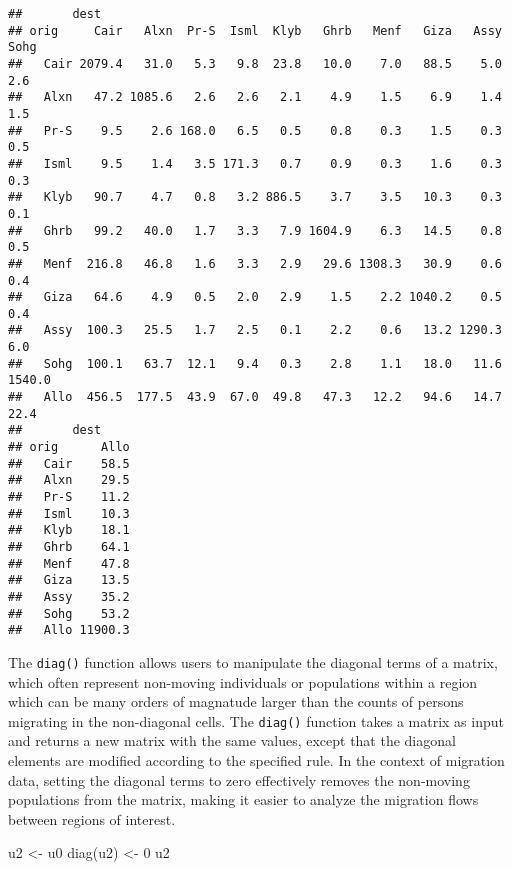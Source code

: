 \documentclass[
]{book}
\newenvironment{Shaded}{\begin{snugshade}}{\end{snugshade}}
\newcommand{\DecValTok}[1]{\textcolor[rgb]{0.00,0.00,0.81}{#1}}
\newcommand{\FunctionTok}[1]{\textcolor[rgb]{0.00,0.00,0.00}{#1}}
\newcommand{\NormalTok}[1]{#1}
\newcommand{\OtherTok}[1]{\textcolor[rgb]{0.56,0.35,0.01}{#1}}
\begin{document}
\begin{verbatim}
##       dest
## orig     Cair   Alxn  Pr-S  Isml  Klyb   Ghrb   Menf   Giza   Assy   Sohg
##   Cair 2079.4   31.0   5.3   9.8  23.8   10.0    7.0   88.5    5.0    2.6
##   Alxn   47.2 1085.6   2.6   2.6   2.1    4.9    1.5    6.9    1.4    1.5
##   Pr-S    9.5    2.6 168.0   6.5   0.5    0.8    0.3    1.5    0.3    0.5
##   Isml    9.5    1.4   3.5 171.3   0.7    0.9    0.3    1.6    0.3    0.3
##   Klyb   90.7    4.7   0.8   3.2 886.5    3.7    3.5   10.3    0.3    0.1
##   Ghrb   99.2   40.0   1.7   3.3   7.9 1604.9    6.3   14.5    0.8    0.5
##   Menf  216.8   46.8   1.6   3.3   2.9   29.6 1308.3   30.9    0.6    0.4
##   Giza   64.6    4.9   0.5   2.0   2.9    1.5    2.2 1040.2    0.5    0.4
##   Assy  100.3   25.5   1.7   2.5   0.1    2.2    0.6   13.2 1290.3    6.0
##   Sohg  100.1   63.7  12.1   9.4   0.3    2.8    1.1   18.0   11.6 1540.0
##   Allo  456.5  177.5  43.9  67.0  49.8   47.3   12.2   94.6   14.7   22.4
##       dest
## orig      Allo
##   Cair    58.5
##   Alxn    29.5
##   Pr-S    11.2
##   Isml    10.3
##   Klyb    18.1
##   Ghrb    64.1
##   Menf    47.8
##   Giza    13.5
##   Assy    35.2
##   Sohg    53.2
##   Allo 11900.3
\end{verbatim}

The \texttt{diag()} function allows users to manipulate the diagonal terms of a matrix, which often represent non-moving individuals or populations within a region which can be many orders of magnatude larger than the counts of persons migrating in the non-diagonal cells. The \texttt{diag()} function takes a matrix as input and returns a new matrix with the same values, except that the diagonal elements are modified according to the specified rule. In the context of migration data, setting the diagonal terms to zero effectively removes the non-moving populations from the matrix, making it easier to analyze the migration flows between regions of interest.

\begin{Shaded}
\begin{Highlighting}[]
\NormalTok{u2 }\OtherTok{\textless{}{-}}\NormalTok{ u0}
\FunctionTok{diag}\NormalTok{(u2) }\OtherTok{\textless{}{-}} \DecValTok{0}
\NormalTok{u2}
\end{Highlighting}
\end{Shaded}
\end{document}
